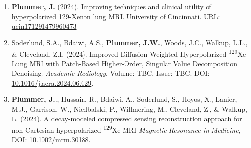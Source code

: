 \documentclass[12pt,]{scrartcl}
\begin{document}
\begin{enumerate}
  \leftskip-0.13in %


    \item \textbf{Plummer, J.} (2024). Improving techniques and clinical utility of hyperpolarized 129-Xenon lung MRI. University of Cincinnati. URL: \href{http://rave.ohiolink.edu/etdc/view?acc_num=ucin171291479960473}{ucin171291479960473}
  
    \item Soderlund, S.A., Bdaiwi, A.S., \textbf{Plummer, J.W.}, Woods, J.C., Walkup, L.L., \& Cleveland, Z.I. (2024). Improved Diffusion-Weighted Hyperpolarized \textsuperscript{129}Xe Lung MRI with Patch-Based Higher-Order, Singular Value Decomposition Denoising. \textit{Academic Radiology}, Volume: TBC, Issue: TBC. DOI: \href{https://doi.org/10.1016/j.acra.2024.06.029}{10.1016/j.acra.2024.06.029}.
  
    \item  \textbf{Plummer, J.}., Hussain, R., Bdaiwi, A., Soderlund, S., Hoyos, X., Lanier, M.J., Garrison, W., Niedbalski, P., Willmering, M., Cleveland, Z., \& Walkup, L. (2024). A decay-modeled compressed sensing reconstruction approach for non-Cartesian hyperpolarized \textsuperscript{129}Xe MRI \textit{Magnetic Resonance in Medicine}, %
    DOI: \href{https://doi.org/10.1002/mrm.30188}{10.1002/mrm.30188}.


\end{enumerate}
\end{document}
